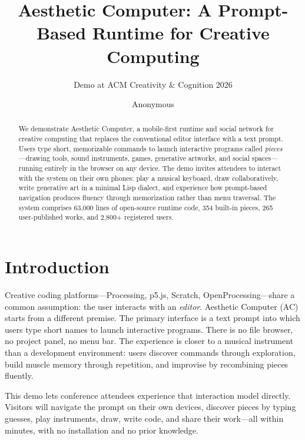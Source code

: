 \documentclass[manuscript,anonymous,review]{acmart}
\begin{document}
\title{Aesthetic Computer: A Prompt-Based Runtime for Creative Computing}
\subtitle{Demo at ACM Creativity \& Cognition 2026}

\author{Anonymous}

\begin{abstract}
We demonstrate Aesthetic Computer, a mobile-first runtime and social network for creative computing that replaces the conventional editor interface with a text prompt. Users type short, memorizable commands to launch interactive programs called \emph{pieces}---drawing tools, sound instruments, games, generative artworks, and social spaces---running entirely in the browser on any device. The demo invites attendees to interact with the system on their own phones: play a musical keyboard, draw collaboratively, write generative art in a minimal Lisp dialect, and experience how prompt-based navigation produces fluency through memorization rather than menu traversal. The system comprises 63,000 lines of open-source runtime code, 354 built-in pieces, 265 user-published works, and 2,800+ registered users.
\end{abstract}


\maketitle

\section{Introduction}

Creative coding platforms---Processing, p5.js, Scratch, OpenProcessing---share a common assumption: the user interacts with an \emph{editor}. Aesthetic Computer (AC) starts from a different premise. The primary interface is a text prompt into which users type short names to launch interactive programs. There is no file browser, no project panel, no menu bar. The experience is closer to a musical instrument than a development environment: users discover commands through exploration, build muscle memory through repetition, and improvise by recombining pieces fluently.

This demo lets conference attendees experience that interaction model directly. Visitors will navigate the prompt on their own devices, discover pieces by typing guesses, play instruments, draw, write code, and share their work---all within minutes, with no installation and no prior knowledge.
\end{document}
